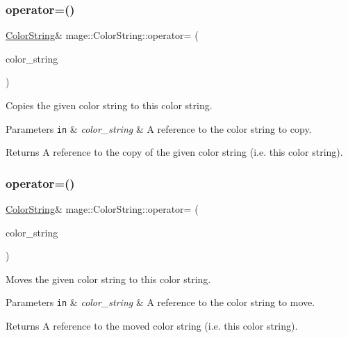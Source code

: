 \subsubsection{\texorpdfstring{operator=()}{operator=()}\hspace{0.1cm}{\footnotesize\ttfamily [1/2]}}
{\footnotesize\ttfamily \hyperlink{classmage_1_1_color_string}{Color\+String}\& mage\+::\+Color\+String\+::operator= (\begin{DoxyParamCaption}\item[{const \hyperlink{classmage_1_1_color_string}{Color\+String} \&}]{color\+\_\+string }\end{DoxyParamCaption})\hspace{0.3cm}{\ttfamily [default]}}

Copies the given color string to this color string.


\begin{DoxyParams}[1]{Parameters}
\mbox{\tt in}  & {\em color\+\_\+string} & A reference to the color string to copy. \\
\hline
\end{DoxyParams}
\begin{DoxyReturn}{Returns}
A reference to the copy of the given color string (i.\+e. this color string). 
\end{DoxyReturn}
\hypertarget{classmage_1_1_color_string_a2016416ce91bb7e94a8869201db47ef1}{}\label{classmage_1_1_color_string_a2016416ce91bb7e94a8869201db47ef1} 
\subsubsection{\texorpdfstring{operator=()}{operator=()}\hspace{0.1cm}{\footnotesize\ttfamily [2/2]}}
{\footnotesize\ttfamily \hyperlink{classmage_1_1_color_string}{Color\+String}\& mage\+::\+Color\+String\+::operator= (\begin{DoxyParamCaption}\item[{\hyperlink{classmage_1_1_color_string}{Color\+String} \&\&}]{color\+\_\+string }\end{DoxyParamCaption})\hspace{0.3cm}{\ttfamily [default]}}

Moves the given color string to this color string.


\begin{DoxyParams}[1]{Parameters}
\mbox{\tt in}  & {\em color\+\_\+string} & A reference to the color string to move. \\
\hline
\end{DoxyParams}
\begin{DoxyReturn}{Returns}
A reference to the moved color string (i.\+e. this color string). 
\end{DoxyReturn}
\hypertarget{classmage_1_1_color_string_ae735ab55789bb21741c6ad3c8115a146}{}\label{classmage_1_1_color_string_ae735ab55789bb21741c6ad3c8115a146} 
